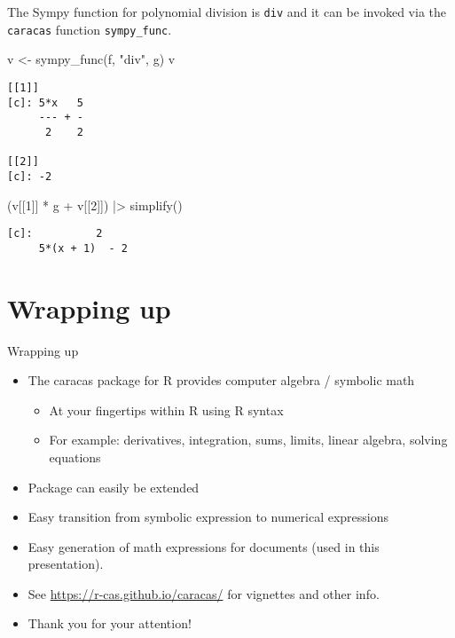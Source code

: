 \documentclass[
  ignorenonframetext,
]{beamer}
\newenvironment{Shaded}{\begin{snugshade}}{\end{snugshade}}
\newcommand{\DecValTok}[1]{\textcolor[rgb]{0.68,0.00,0.00}{#1}}
\newcommand{\FunctionTok}[1]{\textcolor[rgb]{0.28,0.35,0.67}{#1}}
\newcommand{\NormalTok}[1]{\textcolor[rgb]{0.00,0.23,0.31}{#1}}
\newcommand{\OtherTok}[1]{\textcolor[rgb]{0.00,0.23,0.31}{#1}}
\newcommand{\SpecialCharTok}[1]{\textcolor[rgb]{0.37,0.37,0.37}{#1}}
\newcommand{\StringTok}[1]{\textcolor[rgb]{0.13,0.47,0.30}{#1}}
\providecommand{\tightlist}{%
  \setlength{\itemsep}{0pt}\setlength{\parskip}{0pt}}\usepackage{longtable,booktabs,array}
\begin{document}
\begin{frame}[fragile]
The Sympy function for polynomial division is \texttt{div} and it can be
invoked via the \texttt{caracas} function \texttt{sympy\_func}.

\begin{Shaded}
\begin{Highlighting}[]
\NormalTok{v }\OtherTok{\textless{}{-}} \FunctionTok{sympy\_func}\NormalTok{(f, }\StringTok{"div"}\NormalTok{, g)}
\NormalTok{v}
\end{Highlighting}
\end{Shaded}

\begin{verbatim}
[[1]]
[c]: 5*x   5
     --- + -
      2    2

[[2]]
[c]: -2
\end{verbatim}

\begin{Shaded}
\begin{Highlighting}[]
\NormalTok{(v[[}\DecValTok{1}\NormalTok{]] }\SpecialCharTok{*}\NormalTok{ g }\SpecialCharTok{+}\NormalTok{ v[[}\DecValTok{2}\NormalTok{]]) }\SpecialCharTok{|\textgreater{}} \FunctionTok{simplify}\NormalTok{()}
\end{Highlighting}
\end{Shaded}

\begin{verbatim}
[c]:          2    
     5*(x + 1)  - 2
\end{verbatim}
\end{frame}

\hypertarget{wrapping-up}{%
\section{Wrapping up}\label{wrapping-up}}

\begin{frame}{Wrapping up}
\begin{itemize}
\item
  The caracas package for R provides computer algebra / symbolic math

  \begin{itemize}
  \tightlist
  \item
    At your fingertips within R using R syntax
  \item
    For example: derivatives, integration, sums, limits, linear algebra,
    solving equations
  \end{itemize}
\item
  Package can easily be extended
\item
  Easy transition from symbolic expression to numerical expressions
\item
  Easy generation of math expressions for documents (used in this
  presentation).
\item
  See \url{https://r-cas.github.io/caracas/} for vignettes and other
  info.
\item
  Thank you for your attention!
\end{itemize}
\end{frame}
\end{document}
